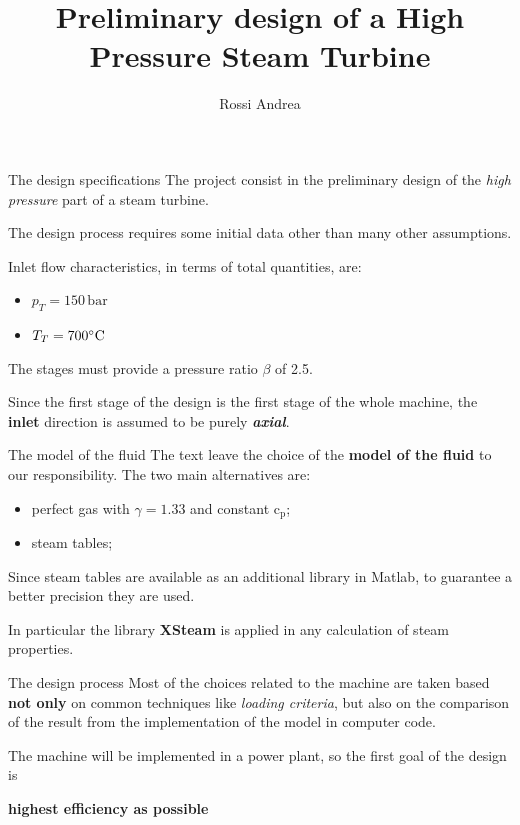\documentclass{beamer}
\author{Rossi Andrea}
\title{Preliminary design of a High Pressure Steam Turbine}
\institute{Politecnico di Milano}
\date{}
\newcommand{\myspace}[0]{\vspace{0.3cm}}
\newcommand{\highlightgreenC}[1]{\textcolor{chameleongreen3}{#1}}%
\begin{document}
\begin{frame}[t,plain]
\titlepage
\end{frame}

\begin{frame}[t]{The design specifications}
The project consist in the preliminary design of the \highlightgreenC{\emph{high pressure}} part of a steam turbine.

The design process requires some initial data other than many other assumptions.

Inlet flow characteristics, in terms of total quantities, are:
\begin{itemize}
	\item ${p}_{T} = 150\,\text{bar}$
	\item $T_{T} = 700\celsius$
\end{itemize}
The stages must provide a pressure ratio $\beta$ of 2.5.

Since the first stage of the design is the first stage of the whole machine, the \textbf{inlet} direction is assumed to be purely \emph{\textbf{axial}}.
\end{frame}

\begin{frame}[t]{The model of the fluid}
The text leave the choice of the \textbf{model of the fluid} to our responsibility.
The two main alternatives are:
\begin{itemize}
	\item perfect gas with $\gamma = 1.33$ and constant $\text{c}_\text{p}$;
	\item steam tables;
\end{itemize}
Since steam tables are available as an additional library in Matlab, to guarantee a better precision they are used.

In particular the library \textbf{XSteam} is applied in any calculation of steam properties.
\end{frame}

\begin{frame}[t]{The design process}
Most of the choices related to the machine are taken based \textbf{not only} on common techniques like \emph{loading criteria}, but also on the comparison of the result from the implementation of the model in computer code.

\myspace
The machine will be implemented in a power plant, so the first goal of the design is
\begin{center}
\highlightgreenC{\textbf{highest efficiency as possible}}
\end{center}
\end{frame}
\end{document}
